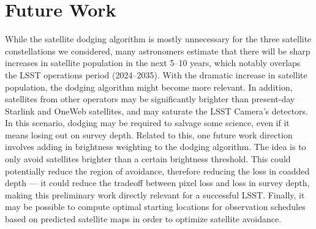 \documentclass[linenumbers]{aastex631}
\begin{document}
\section{Future Work}
While the satellite dodging algorithm is mostly unnecessary for the three satellite constellations we considered, many astronomers estimate that there will be sharp increases in satellite population in the next 5–10 years, which notably overlaps the LSST operations period (2024–2035). With the dramatic increase in satellite population, the dodging algorithm might become more relevant. In addition, satellites from other operators may be significantly brighter than present-day Starlink and OneWeb satellites, and may saturate the LSST Camera’s detectors. In this scenario, dodging may be required to salvage some science, even if it means losing out on survey depth. Related to this, one future work direction involves adding in brightness weighting to the dodging algorithm. The idea is to only avoid satellites brighter than a certain brightness threshold. This could potentially reduce the region of avoidance, therefore reducing the loss in coadded depth — it could reduce the tradeoff between pixel loss and loss in survey depth, making this preliminary work directly relevant for a successful LSST. Finally, it may be possible to compute optimal starting locations for observation schedules based on predicted satellite maps in order to optimize satellite avoidance.






{}

\end{document}
